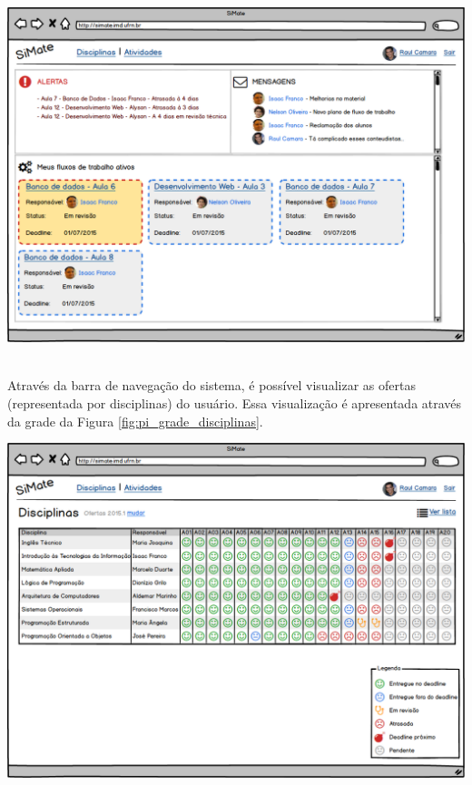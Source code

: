 \vspace{5mm}
\begin{minipage}[c]{\textwidth}
    \includegraphics[width=15cm]{Imagens/SiMateTelas/Index.png}
	\label{fig:pi_tela_inicial}
\end{minipage} \\

Através da barra de navegação do sistema, é possível visualizar as ofertas (representada por disciplinas) do usuário. Essa visualização é apresentada através da grade da Figura \hyperref[fig:pi_grade_disciplinas]{\ref{fig:pi_grade_disciplinas}}.

\vspace{5mm}
\begin{minipage}[c]{\textwidth}
    \includegraphics[width=15cm]{Imagens/SiMateTelas/GradeDisciplinas.png}
	\label{fig:pi_grade_disciplinas}
\end{minipage} \\

